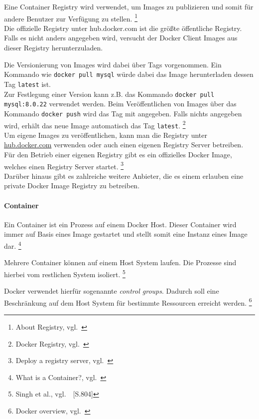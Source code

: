 Eine Container Registry wird verwendet, um Images zu publizieren und somit für andere Benutzer zur Verfügung zu stellen.
\footnote{About Registry, vgl.~\cite{DOCKER_ABOUT_REGISTRY}} \\

Die offizielle Registry unter hub.docker.com ist die größte öffentliche Registry.
Falls es nicht anders angegeben wird, versucht der Docker Client Images aus dieser Registry herunterzuladen.

Die Versionierung von Images wird dabei über Tags vorgenommen.
Ein Kommando wie \texttt{docker pull mysql} würde dabei das Image herunterladen dessen Tag \texttt{latest} ist. \\

Zur Festlegung einer Version kann z.B. das Kommando \texttt{docker pull mysql:8.0.22} verwendet werden.
Beim Veröffentlichen von Images über das Kommando \texttt{docker push} wird das Tag mit angegeben.
Falls nichts angegeben wird, erhält das neue Image automatisch das Tag \texttt{latest}.
\footnote{Docker Registry, vgl.~\cite{DOCKER_BASICS_REGISTRY}} \\

Um eigene Images zu veröffentlichen, kann man die Registry unter \href{https://hub.docker.com/}{hub.docker.com} verwenden oder auch einen eigenen Registry Server betreiben.
Für den Betrieb einer eigenen Registry gibt es ein offizielles Docker Image, welches einen Registry Server startet.
\footnote{Deploy a registry server, vgl.~\cite{DOCKER_DEPLOY_REGISTRY}} \\

Darüber hinaus gibt es zahlreiche weitere Anbieter, die es einem erlauben eine private Docker Image Registry zu betreiben.

\paragraph{Container}

Ein Container ist ein Prozess auf einem Docker Host.
Dieser Container wird immer auf Basis eines Image gestartet und stellt somit eine Instanz eines Image dar.
\footnote{What is a Container?, vgl.~\cite{DOCKER_WEBSITE}}

Mehrere Container können auf einem Host System laufen.
Die Prozesse sind hierbei vom restlichen System isoliert.
\footnote{Singh et al., vgl.~\cite{Singh2017}~[S.804]}

Docker verwendet hierfür sogenannte \textit{control groups}.
Dadurch soll eine Beschränkung auf dem Host System für bestimmte Ressourcen erreicht werden.
\footnote{Docker overview, vgl.~\cite{DOCKER_OVERVIEW}} \\

